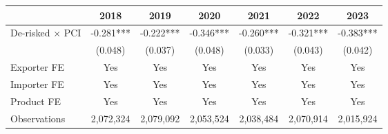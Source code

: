 \begin{tabular}{lcccccc}
\toprule
 & 2018 & 2019 & 2020 & 2021 & 2022 & 2023 \\
\midrule
De-risked $\times$ PCI & -0.281*** & -0.222*** & -0.346*** & -0.260*** & -0.321*** & -0.383*** \\
 & (0.048) & (0.037) & (0.048) & (0.033) & (0.043) & (0.042) \\
\midrule
Exporter FE & Yes & Yes & Yes & Yes & Yes & Yes \\
Importer FE & Yes & Yes & Yes & Yes & Yes & Yes \\
Product FE & Yes & Yes & Yes & Yes & Yes & Yes \\
Observations & 2,072,324 & 2,079,092 & 2,053,524 & 2,038,484 & 2,070,914 & 2,015,924 \\
\bottomrule
\end{tabular}